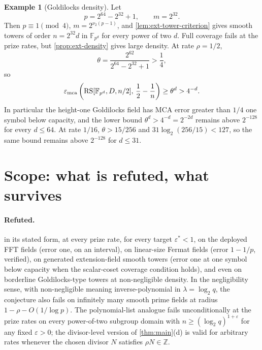 \documentclass[11pt]{article}
\theoremstyle{definition}
\newtheorem{example}[example]{Example}
\newcommand{\F}{\mathbb F}
\newcommand{\Z}{\mathbb Z}
\newcommand{\RS}{\operatorname{RS}}
\newcommand{\eps}{\varepsilon}
\newcommand{\vtwo}{\nu_2}
\begin{document}
\begin{example}[Goldilocks density]\label{ex:goldilocks-density}
Let
\[
        p=2^{64}-2^{32}+1,
        \qquad m=2^{32}.
\]
Then $p\equiv1\pmod4$, $m=2^{\vtwo(p-1)}$, and \cref{lem:ext-tower-criterion} gives smooth towers of order $n=2^{32}d$ in $\F_{p^d}$ for every power of two $d$.  Full coverage fails at the prize rates, but \cref{prop:ext-density} gives large density.  At rate $\rho=1/2$,
\[
        \theta=\frac{2^{62}}{2^{64}-2^{32}+1}>\frac14,
\]
so
\[
        \eps_{\rm mca}\left(\RS[\F_{p^d},D,n/2],\,\frac12-\frac1n\right)\ge\theta^d>4^{-d}.
\]
In particular the height-one Goldilocks field has MCA error greater than $1/4$ one symbol below capacity, and the lower bound $\theta^d>4^{-d}=2^{-2d}$ remains above $2^{-128}$ for every $d\le64$.  At rate $1/16$, $\theta>15/256$ and $31\log_2(256/15)<127$, so the same bound remains above $2^{-128}$ for $d\le31$.
\end{example}

\section{Scope: what is refuted, what survives}\label{sec:scope}

\paragraph{Refuted.}   in its stated form, at every prize rate, for every target $\eps^*<1$, on the deployed FFT fields (error one, on an interval), on linear-size Fermat fields (error $1-1/p$, verified), on generated extension-field smooth towers (error one at one symbol below capacity when the scalar-coset coverage condition holds), and even on borderline Goldilocks-type towers at non-negligible density.  In the negligibility sense, with non-negligible meaning inverse-polynomial in $\lambda=\log_2q$, the conjecture also fails on infinitely many smooth prime fields at radius $1-\rho-O(1/\log p)$.  The polynomial-list analogue fails unconditionally at the prize rates on every power-of-two subgroup domain with $n\ge(\log_2q)^{1+\eps}$ for any fixed $\eps>0$; the divisor-level version of \cref{thm:main}(d) is valid for arbitrary rates whenever the chosen divisor $N$ satisfies $\rho N\in\Z$.
\end{document}
